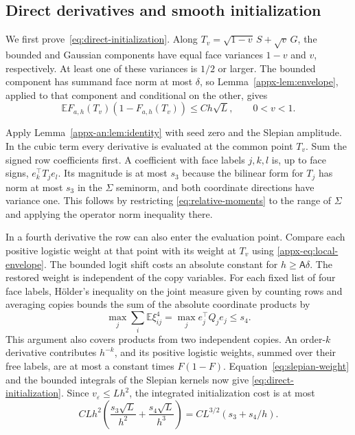 \documentclass[11pt,letterpaper]{article}
\theoremstyle{remark}
\newcommand{\E}{\mathbb E}
\begin{document}
\subsection{Direct derivatives and smooth initialization}
\label{appx-an:sec:initialization}

We first prove~\eqref{eq:direct-initialization}. Along
\(T_v=\sqrt{1-v}\,S+\sqrt v\,G\), the bounded and Gaussian
components have equal face variances \(1-v\) and \(v\), respectively.
At least one of these variances is \(1/2\) or larger. The bounded
component has summand face
norm at most \(\delta\), so Lemma~\ref{appx-lem:envelope}, applied
to that component and conditional on the other, gives
\begin{equation}
 \E F_{a,h}(T_v)(1-F_{a,h}(T_v))\le Ch\sqrt L,
 \qquad 0<v<1.
 \label{eq:slepian-weight}
\end{equation}

Apply Lemma~\ref{appx-an:lem:identity} with seed zero and the Slepian amplitude. In the cubic term every derivative is evaluated at the common point $T_v$. Sum the signed row coefficients first. A coefficient with face labels $j,k,l$ is, up to face signs, $e_k^\top T_j e_l$. Its magnitude is at most $s_3$ because the bilinear form for $T_j$ has norm at most $s_3$ in the $\Sigma$ seminorm, and both coordinate directions have variance one. This follows by restricting \eqref{eq:relative-moments} to the range of $\Sigma$ and applying the operator norm inequality there.

In a fourth derivative the row can also enter the evaluation point. Compare each positive logistic weight at that point with its weight at $T_v$ using \eqref{appx-eq:local-envelope}. The bounded logit shift costs an absolute constant for $h\ge\mathsf A\delta$. The restored weight is independent of the copy variables. For each fixed list of four face labels, H\"older's inequality on the joint measure given by counting rows and averaging copies bounds the sum of the absolute coordinate products by
\[
 \max_j\sum_i\E\xi_{ij}^4=\max_j e_j^\top Q_j e_j\le s_4.
\]
This argument also covers products from two independent copies. An order-$k$ derivative contributes $h^{-k}$, and its positive logistic weights, summed over their free labels, are at most a constant times $F(1-F)$. Equation~\eqref{eq:slepian-weight} and the bounded integrals of the Slepian kernels now give \eqref{eq:direct-initialization}. Since $v_\varepsilon\le Lh^2$, the integrated initialization cost is at most
\[
 C Lh^2\left(\frac{s_3\sqrt L}{h^2}+\frac{s_4\sqrt L}{h^3}\right)
 = C L^{3/2}(s_3+s_4/h).
\]
\end{document}
